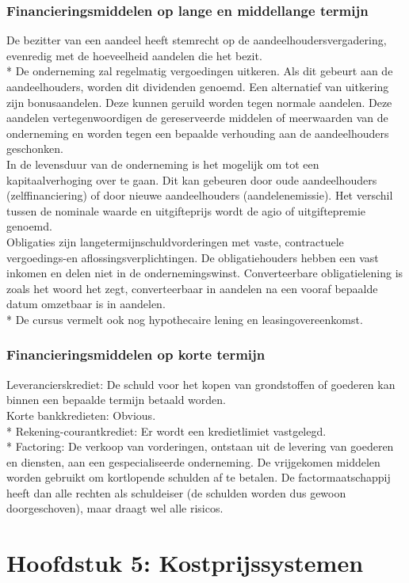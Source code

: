 \documentclass[12pt]{article}
\begin{document}
\subsubsection{Financieringsmiddelen op lange en middellange termijn}
De bezitter van een aandeel heeft stemrecht op de aandeelhoudersvergadering, evenredig met de hoeveelheid aandelen die het bezit.\\*
De onderneming zal regelmatig vergoedingen uitkeren. Als dit gebeurt aan de aandeelhouders, worden dit dividenden genoemd. Een alternatief van uitkering zijn bonusaandelen. Deze kunnen geruild worden tegen normale aandelen. Deze aandelen vertegenwoordigen de gereserveerde middelen of meerwaarden van de onderneming en worden tegen een bepaalde verhouding aan de aandeelhouders geschonken.\\
In de levensduur van de onderneming is het mogelijk om tot een kapitaalverhoging over te gaan. Dit kan gebeuren door oude aandeelhouders (zelffinanciering) of door nieuwe aandeelhouders (aandelenemissie). Het verschil tussen de nominale waarde en uitgifteprijs wordt de agio of uitgiftepremie genoemd.\\
Obligaties zijn langetermijnschuldvorderingen met vaste, contractuele vergoedings-en aflossingsverplichtingen. De obligatiehouders hebben een vast inkomen en delen niet in de ondernemingswinst. Converteerbare obligatielening is zoals het woord het zegt, converteerbaar in aandelen na een vooraf bepaalde datum omzetbaar is in aandelen.\\*
De cursus vermelt ook nog hypothecaire lening en leasingovereenkomst.
\subsubsection{Financieringsmiddelen op korte termijn}
Leverancierskrediet: De schuld voor het kopen van grondstoffen of goederen kan binnen een bepaalde termijn betaald worden.\\
Korte bankkredieten: Obvious.\\*
Rekening-courantkrediet: Er wordt een kredietlimiet vastgelegd.\\*
Factoring: De verkoop van vorderingen, ontstaan uit de levering van goederen en diensten, aan een gespecialiseerde onderneming. De vrijgekomen middelen worden gebruikt om kortlopende schulden af te betalen. De factormaatschappij heeft dan alle rechten als schuldeiser (de schulden worden dus gewoon doorgeschoven), maar draagt wel alle risicos.
\clearpage
\section{Hoofdstuk 5: Kostprijssystemen}
\end{document}
